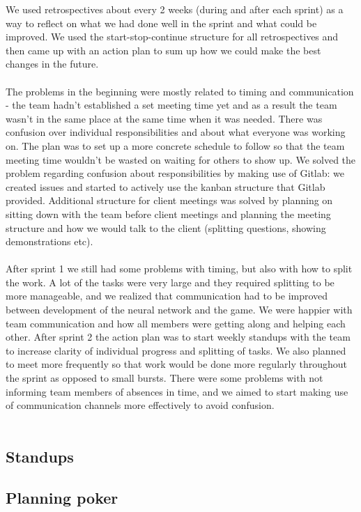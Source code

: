 \documentclass{l3proj}
\begin{document}
We used retrospectives about every 2 weeks (during and after each sprint) as a way to reflect on what we had done well in the sprint and what could be improved. We used the start-stop-continue structure for all retrospectives and then came up with an action plan to sum up how we could make the best changes in the future.
\\\\
The problems in the beginning were mostly related to timing and communication - the team hadn't established a set meeting time yet and as a result the team wasn't in the same place at the same time when it was needed. There was confusion over individual responsibilities and about what everyone was working on. The plan was to set up a more concrete schedule to follow so that the team meeting time wouldn't be wasted on waiting for others to show up. We solved the problem regarding confusion about responsibilities by making use of Gitlab: we created issues and started to actively use the kanban structure that Gitlab provided. Additional structure for client meetings was solved by planning on sitting down with the team before client meetings and planning the meeting structure and how we would talk to the client (splitting questions, showing demonstrations etc).
\\\\
After sprint 1 we still had some problems with timing, but also with how to split the work. A lot of the tasks were very large and they required splitting to be more manageable, and we realized that communication had to be improved between development of the neural network and the game. We were happier with team communication and how all members were getting along and helping each other.
After sprint 2 the action plan was to start weekly standups with the team to increase clarity of individual progress and splitting of tasks. We also planned to meet more frequently so that work would be done more regularly throughout the sprint as opposed to small bursts. There were some problems with not informing team members of absences in time, and we aimed to start making use of communication channels more effectively to avoid confusion.
\\\\


\subsection*{Standups}
\subsection*{Planning poker}
\end{document}
